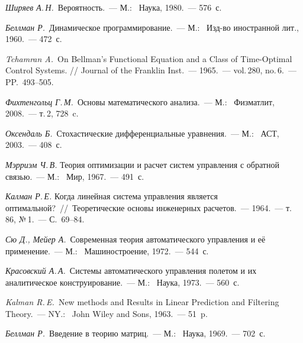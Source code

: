 






\begin{thebibliography}{wlab}


\emph{Ширяев А.\,Н.}~Вероятность.~--- М.:~ Наука, 1980.~--- 576~с.

\emph{Беллман Р.}~Динамическое программирование.~--- М.:~ Изд-во иностранной лит., 1960.~--- 472~с.

\emph{Tchamran A.}~On Bellman's Functional Equation and a Class of Time-Optimal Control Systems. // Journal of the Franklin Inst.~--- 1965.~--- vol.\,280, no.\,6.~--- PP.~493--505.

\emph{Фихтенгольц Г.\,М.}~Основы математического анализа.~--- М.:~ Физматлит, 2008.~--- т.\,2, 728~c.

\emph{Оксендаль Б.}~Стохастические дифференциальные уравнения.~--- М.:~ АСТ, 2003.~--- 408~с.

\emph{Мэрриэм Ч.\,В.} Теория оптимизации и расчет систем управления с обратной связью.~--- М.:~ Мир, 1967.~--- 491~с.

\emph{Калман Р.\,Е.} Когда линейная система управления является оптимальной?~//~Теоретические основы инженерных расчетов.~--- 1964.~--- т.\,86, №\,1.~--- С.~69--84.

\emph{Сю Д., Мейер А.}~Современная теория автоматического управления и её применение.~--- М.:~ Машиностроение, 1972.~--- 544~с.

\emph{Красовский А.\,А.}~Системы автоматического управления полетом и их аналитическое конструирование.~--- М.:~ Наука, 1973.~--- 560~с.

\emph{Kalman R.\,E.}~New methods and Results in Linear Prediction and Filtering Theory.~--- NY.:~ John Wiley and Sons, 1963.~--- 51~p.

\emph{Беллман Р.}~Введение в теорию матриц.~--- М.:~ Наука, 1969.~--- 702~с.


\end{thebibliography}
